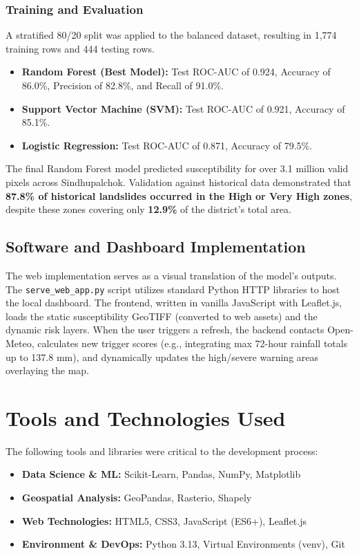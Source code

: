 \subsubsection{Training and Evaluation}
A stratified 80/20 split was applied to the balanced dataset, resulting in 1,774 training rows and 444 testing rows. 
\begin{itemize}
    \item \textbf{Random Forest (Best Model):} Test ROC-AUC of 0.924, Accuracy of 86.0\%, Precision of 82.8\%, and Recall of 91.0\%.
    \item \textbf{Support Vector Machine (SVM):} Test ROC-AUC of 0.921, Accuracy of 85.1\%.
    \item \textbf{Logistic Regression:} Test ROC-AUC of 0.871, Accuracy of 79.5\%.
\end{itemize}

The final Random Forest model predicted susceptibility for over 3.1 million valid pixels across Sindhupalchok. Validation against historical data demonstrated that \textbf{87.8\% of historical landslides occurred in the High or Very High zones}, despite these zones covering only \textbf{12.9\%} of the district's total area.

\subsection{Software and Dashboard Implementation}
The web implementation serves as a visual translation of the model's outputs. The \texttt{serve\_web\_app.py} script utilizes standard Python HTTP libraries to host the local dashboard. The frontend, written in vanilla JavaScript with Leaflet.js, loads the static susceptibility GeoTIFF (converted to web assets) and the dynamic risk layers. 
When the user triggers a refresh, the backend contacts Open-Meteo, calculates new trigger scores (e.g., integrating max 72-hour rainfall totals up to 137.8 mm), and dynamically updates the high/severe warning areas overlaying the map.

\section{Tools and Technologies Used}
The following tools and libraries were critical to the development process:
\begin{itemize}
    \item \textbf{Data Science \& ML:} Scikit-Learn, Pandas, NumPy, Matplotlib
    \item \textbf{Geospatial Analysis:} GeoPandas, Rasterio, Shapely
    \item \textbf{Web Technologies:} HTML5, CSS3, JavaScript (ES6+), Leaflet.js
    \item \textbf{Environment \& DevOps:} Python 3.13, Virtual Environments (venv), Git
\end{itemize}

